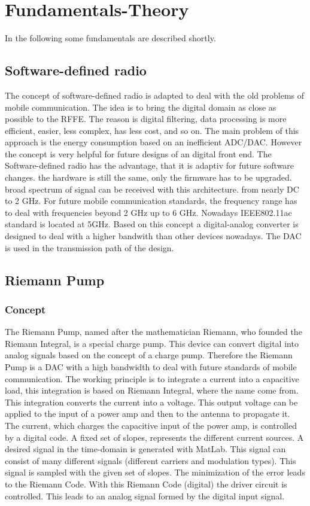 \chapter{Fundamentals-Theory}
In the following some fundamentals are described shortly.
\section{Software-defined radio}
The concept of software-defined radio is adapted to deal with the old problems of mobile communication. The idea is to bring the digital domain as close as possible to the RFFE. The reason is digital filtering, data processing is more efficient, easier, less complex, has less cost, and so on. The main problem of this approach is the energy consumption based on an inefficient ADC/DAC. However the concept is very helpful for future designs of an digital front end. The Software-defined radio has the advantage, that it is adaptiv for future software changes. the hardware is still the same, only the firmware has to be upgraded. broad spectrum of signal can be received with this architecture. from nearly DC to 2 GHz. For future mobile communication standards, the frequency range has to deal with frequencies beyond 2 GHz up to 6 GHz. Nowadays IEEE802.11ac standard is located at 5GHz. Based on this concept a digital-analog converter is designed to deal with a higher bandwith than other devices nowadays. The DAC is used in the transmission path of the design.
\section{Riemann Pump}
\subsection{Concept}
The Riemann Pump, named after the mathematician Riemann, who founded the Riemann Integral, is a special charge pump. This device can convert digital into analog signals based on the concept of a charge pump. Therefore the Riemann Pump is a DAC with a high bandwidth to deal with future standards of mobile communication. The working principle is to
integrate a current into a capacitive load, this integration is based on Riemann Integral, where the name come from. This integration converts the current into a voltage. This output voltage can be applied to the input of a power amp and then to the antenna to propagate it. The current, which charges the capacitive input of the power amp, is controlled by a digital code. A fixed set of slopes, represents the different current sources. A desired signal in the time-domain is generated with MatLab. This signal can consist of many different signals (different carriers and modulation types). This signal is sampled with the given set of slopes. The minimization of the error leads to the Riemann Code. With this Riemann Code (digital) the driver circuit is controlled. This leads to an analog signal formed by the digital input signal. 
